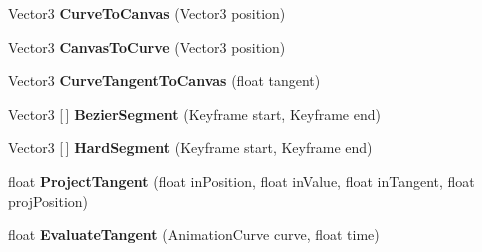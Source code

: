 \begin{DoxyCompactItemize}
Vector3 {\bfseries Curve\+To\+Canvas} (Vector3 position)
\item 
\mbox{\label{class_unity_editor_1_1_post_processing_1_1_curve_editor_adad83d63a0dd6b8458cb315896d49ad6}} 
Vector3 {\bfseries Canvas\+To\+Curve} (Vector3 position)
\item 
\mbox{\label{class_unity_editor_1_1_post_processing_1_1_curve_editor_acad5420c23f3094fe20ab9d6b6a1f7c3}} 
Vector3 {\bfseries Curve\+Tangent\+To\+Canvas} (float tangent)
\item 
\mbox{\label{class_unity_editor_1_1_post_processing_1_1_curve_editor_ae89da80b5420d192ce01259bccc0193d}} 
Vector3 \mbox{[}$\,$\mbox{]} {\bfseries Bezier\+Segment} (Keyframe start, Keyframe end)
\item 
\mbox{\label{class_unity_editor_1_1_post_processing_1_1_curve_editor_ad74140d6a02722f07750426fff21e990}} 
Vector3 \mbox{[}$\,$\mbox{]} {\bfseries Hard\+Segment} (Keyframe start, Keyframe end)
\item 
\mbox{\label{class_unity_editor_1_1_post_processing_1_1_curve_editor_ae1e270b09c5f7ad750a402dd4fa1f087}} 
float {\bfseries Project\+Tangent} (float in\+Position, float in\+Value, float in\+Tangent, float proj\+Position)
\item 
\mbox{\label{class_unity_editor_1_1_post_processing_1_1_curve_editor_adda462f2607142de391018918033f513}} 
float {\bfseries Evaluate\+Tangent} (Animation\+Curve curve, float time)
\end{DoxyCompactItemize}
